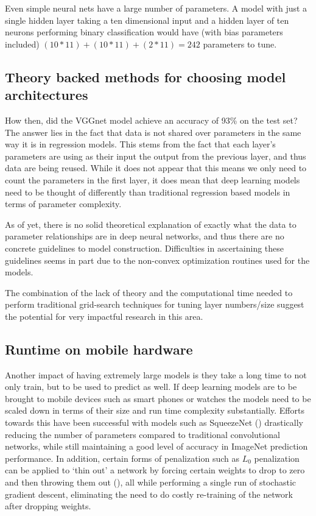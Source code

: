 \documentclass[]{book}
\theoremstyle{definition}
\theoremstyle{definition}
\theoremstyle{definition}
\theoremstyle{remark}
\begin{document}
Even simple neural nets have a large number of parameters. A model with
just a single hidden layer taking a ten dimensional input and a hidden
layer of ten neurons performing binary classification would have (with
bias parameters included) \((10*11) + (10*11) + (2*11) = 242\)
parameters to tune.

\subsection{Theory backed methods for choosing model
architectures}\label{theory-backed-methods-for-choosing-model-architectures}

How then, did the VGGnet model achieve an accuracy of 93\% on the test
set? The answer lies in the fact that data is not shared over parameters
in the same way it is in regression models. This stems from the fact
that each layer's parameters are using as their input the output from
the previous layer, and thus data are being reused. While it does not
appear that this means we only need to count the parameters in the first
layer, it does mean that deep learning models need to be thought of
differently than traditional regression based models in terms of
parameter complexity\citep[\^{}It also points to the advantages of deep
neural nets over wide ones, a topic considered more deeply in][ chapter
13.]{goodfellow_DL}.

As of yet, there is no solid theoretical explanation of exactly what the
data to parameter relationships are in deep neural networks, and thus
there are no concrete guidelines to model construction. Difficulties in
ascertaining these guidelines seems in part due to the non-convex
optimization routines used for the models.

The combination of the lack of theory and the computational time needed
to perform traditional grid-search techniques for tuning layer
numbers/size suggest the potential for very impactful research in this
area.

\subsection{Runtime on mobile
hardware}\label{runtime-on-mobile-hardware}

Another impact of having extremely large models is they take a long time
to not only train, but to be used to predict as well. If deep learning
models are to be brought to mobile devices such as smart phones or
watches the models need to be scaled down in terms of their size and run
time complexity substantially. Efforts towards this have been successful
with models such as SqueezeNet (\citet{squeezenet}) drastically reducing
the number of parameters compared to traditional convolutional networks,
while still maintaining a good level of accuracy in ImageNet prediction
performance. In addition, certain forms of penalization such as \(L_0\)
penalization can be applied to `thin out' a network by forcing certain
weights to drop to zero and then throwing them out (\citet{sparsenets}),
all while performing a single run of stochastic gradient descent,
eliminating the need to do costly re-training of the network after
dropping weights.
\end{document}
